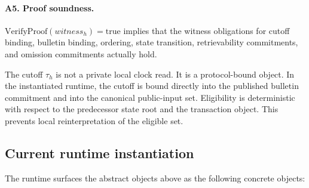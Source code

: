 \documentclass[11pt]{article}
\begin{document}
\paragraph{A5. Proof soundness.}
\(\mathrm{VerifyProof}(witness_h) = \mathrm{true}\) implies that the witness
obligations for cutoff binding, bulletin binding, ordering, state transition,
retrievability commitments, and omission commitments actually hold.

The cutoff \(\tau_h\) is not a private local clock read. It is a protocol-bound
object. In the instantiated runtime, the cutoff is bound directly into
the published bulletin commitment and into the canonical public-input set.
Eligibility is deterministic with respect to the predecessor state root and the
transaction object. This prevents local reinterpretation of the eligible set.

\subsection{Current runtime instantiation}

The runtime surfaces the abstract objects above as the following concrete
objects:
\end{document}
